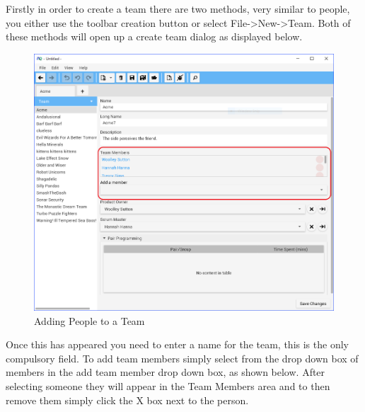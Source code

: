 Firstly in order to create a team there are two methods, very similar to people, you either use the toolbar creation button or select File-\textgreater New-\textgreater Team. Both of these methods will open up a create team dialog as displayed below.

\begin{figure}[h]
	\centering
	\includegraphics[width=\textwidth]{images/screenshots/teams2.PNG}
	\caption{Adding People to a Team}
	\label{fig:new_project}
\end{figure}

Once this has appeared you need to enter a name for the team, this is the only compulsory field. To add team members simply select from the drop down box of members in the add team member drop down box, as shown below. After selecting someone they will appear in the Team Members area and to then remove them simply click the X box next to the person.

